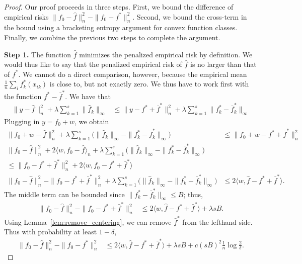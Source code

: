 \begin{proof}
Our proof proceeds in three steps.  First, we bound
the difference of empirical risks $\|f_0 - \hat{f} \|_n^2 - \| f_0 -
f^* \|_n^2$.  Second, we bound the cross-term in the bound using
a bracketing entropy argument for convex function classes.  Finally, 
we combine the previous two steps to complete the argument.

\textbf{Step 1.} The function $\hat{f}$ minimizes the penalized
empirical risk by definition. We would thus like to say that the
penalized empirical risk of $\hat{f}$ is no larger than that of
$f^*$. We cannot do a direct comparison, however, because the empirical mean
$\frac{1}{n} \sum_i f^*_k(x_{ik})$ is close to, but not exactly
zero. We thus have to work first with the function $f^* - \bar{f}^*$.
We have that
\begin{align*}
\| y - \hat{f} \|_n^2 + \lambda \sum_{k=1}^s \| \hat{f}_k \|_\infty &\leq
  \| y - f^* + \bar{f}^* \|_n^2 + \lambda \sum_{k=1}^s \| f^*_k - \bar{f}^*_k \|_\infty 
\end{align*}
Plugging in $y = f_0 + w$, we obtain
\begin{align*}
\| f_0 + w - \hat{f} \|_n^2 + \lambda \sum_{k=1}^s \Big( \| \hat{f}_k \|_\infty - 
    \| f^*_k - \bar{f}^*_k \|_\infty \Big) &\leq \|f_0 + w - f^* + \bar{f}^* \|_n^2 \\
\| f_0 - \hat{f} \|_n^2 + 2\langle w, f_0 - \hat{f} \rangle_n 
     +\lambda \sum_{k=1}^s \Big( \| \hat{f}_k \|_\infty - \|f^*_k -\bar{f}^*_k\|_\infty \Big) 
    &\\
\leq \| f_0 - f^* + \bar{f}^* \|_n^2 + 
    2 \langle w, f_0 - f^* + \bar{f}^* \rangle \\
\|f_0 - \hat{f} \|_n^2 - \| f_0 - f^* + \bar{f}^* \|_n^2 + 
    \lambda \sum_{k=1}^s \Big( \| \hat{f}_k \|_\infty - 
 \| f^*_k - \bar{f}^*_k \|_\infty \Big) &\leq 2 \langle w, \hat{f} - f^* + \bar{f}^* \rangle.
\end{align*}
The middle term can be bounded since $\|f^*_k -
\bar{f}^*_k \|_\infty \leq B$; thus,
\begin{align*}
\|f_0 - \hat{f} \|_n^2 - \| f_0 - f^* + \bar{f}^* \|_n^2 
   &\leq 2 \langle w, \hat{f} - f^* + \bar{f}^* \rangle + \lambda s B .
\end{align*}
Using Lemma~\ref{lem:remove_centering}, we can remove $\bar{f}^*$ from
the lefthand side. Thus with probability at least $1 - \delta$,
\begin{align}
\label{eqn:first_step_inequality}
\|f_0 - \hat{f} \|_n^2 - \| f_0 - f^* \|_n^2 
   &\leq 2 \langle w, \hat{f} - f^* + \bar{f}^* \rangle + \lambda  s B + c(sB)^2 \frac{1}{n} \log \frac{2}{\delta}.
\end{align}


\end{proof}
